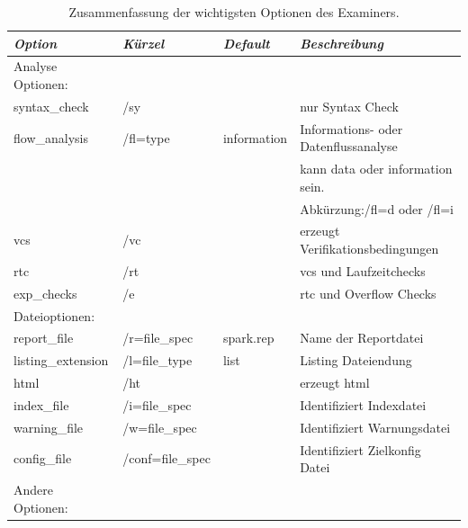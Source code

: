 \begin{footnotesize}
\begin{table}[h!]
\centering
\caption{Zusammenfassung der wichtigsten Optionen des Examiners.}
\label{my-label}
\begin{tabular}{|l|l|l|l|}
\hline
{\it Option}          & {\it Kürzel}     & {\it Default} & {\it Beschreibung}                     \\ \hline
Analyse Optionen:     &                  &               &                                        \\
syntax\_check         & /sy              &               & nur Syntax Check                       \\
flow\_analysis        & /fl=type         & information   & Informations- oder Datenflussanalyse   \\
                      &                  &               & kann data oder information sein.       \\
                      &                  &               & Abkürzung:/fl=d oder /fl=i             \\
vcs                   & /vc              &               & erzeugt Verifikationsbedingungen       \\
rtc                   & /rt              &               & vcs und Laufzeitchecks                 \\
exp\_checks           & /e               &               & rtc und Overflow Checks                \\ \hline
Dateioptionen:        &                  &               &                                        \\
report\_file          & /r=file\_spec    & spark.rep     & Name der Reportdatei                   \\
listing\_extension    & /l=file\_type    & list          & Listing Dateiendung                    \\
html                  & /ht              &               & erzeugt html                           \\
index\_file           & /i=file\_spec    &               & Identifiziert Indexdatei               \\
warning\_file         & /w=file\_spec    &               & Identifiziert Warnungsdatei            \\
config\_file          & /conf=file\_spec &               & Identifiziert Zielkonfig Datei         \\ \hline
Andere Optionen:      &                  &               &                                        \\

\end{tabular}
\end{table}
\end{footnotesize}
